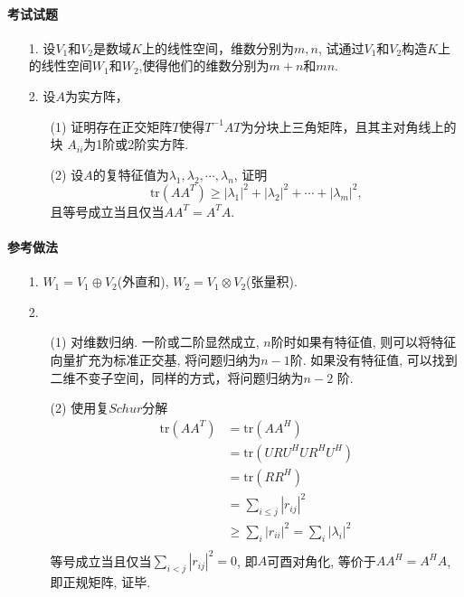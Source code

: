 \paragraph{考试试题} 
\begin{enumerate}
	\item[1.] 设$V_1$和$V_2$是数域$K$上的线性空间，维数分别为$m,n$,
	试通过$V_1$和$V_2$构造$K$上的线性空间$W_1$和$W_2$,使得他们的维数分别为$m+n$和$mn$.
	\item[2.] 设$A$为实方阵，
		\begin{enumerate}
			\item[(1)] 证明存在正交矩阵$T$使得$T^{-1}AT$为分块上三角矩阵，且其主对角线上的块
			$A_{ii}$为1阶或2阶实方阵. 
			\item[(2)] 设$A$的复特征值为$\lambda_1, \lambda_2, \cdots, \lambda_n$, 证明
			$$\mathrm{tr}(AA^T) \ge |\lambda_1|^2 + |\lambda_2|^2 + \cdots + |\lambda_m|^2,$$
			且等号成立当且仅当$AA^T = A^TA$.
		\end{enumerate}
\end{enumerate}

\paragraph{参考做法}
\begin{enumerate}
\item[1.] $W_1 = V_1 \oplus V_2$(外直和), $W_2 = V_1 \otimes V_2$(张量积).  
\item[2.]
	\begin{enumerate}
			\item[(1)] 对维数归纳. 一阶或二阶显然成立, $n$阶时如果有特征值, 则可以将特征向量扩充为标准正交基,
			将问题归纳为$n-1$阶. 如果没有特征值, 可以找到二维不变子空间，同样的方式，将问题归纳为$n-2$ 
			阶.
			\item[(2)] 使用复$Schur$分解
			\begin{equation}
			\nonumber
			\begin{aligned}
				\mathrm{tr}(AA^T) &= \mathrm{tr} (AA^H) \\
				                  &= \mathrm{tr}(URU^HUR^H U^H)\\
				                  &= \mathrm{tr}(RR^H)\\
								  &= \sum_{i\le j } |r_{ij}|^2 \\
								  &\ge \sum_{i} |r_{ii}|^2  = \sum_i |\lambda_i|^2\\
			\end{aligned}
			\end{equation} 
			等号成立当且仅当$\sum_{i<j} |r_{ij}|^2 = 0$, 即$A$可酉对角化, 等价于$AA^H = A^HA$, 即正规矩阵, 证毕.
		\end{enumerate}
\end{enumerate}